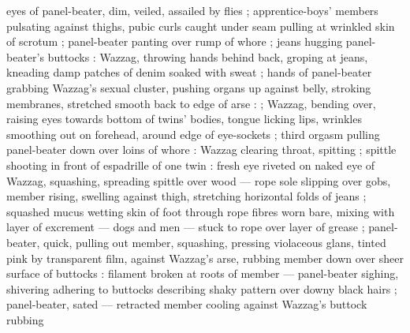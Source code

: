 eyes of panel-beater, dim, veiled, assailed by flies ; apprentice-boys' members pulsating against thighs, pubic curls caught under seam pulling at wrinkled skin of scrotum ; panel-beater panting over rump of whore ; jeans hugging panel-beater's buttocks : Wazzag, throwing hands behind back, groping at jeans, kneading damp patches of denim soaked with sweat ; hands of panel-beater grabbing Wazzag's sexual cluster, pushing organs up against belly, stroking membranes, stretched smooth back to edge of arse : {\td}  ; Wazzag, bending over, raising eyes towards bottom of twins' bodies, tongue licking lips, wrinkles smoothing out on forehead, around edge of eye-sockets ; third orgasm pulling panel-beater down over loins of whore : Wazzag clearing throat, spitting ; spittle shooting in front of espadrille of one twin : fresh eye riveted on naked eye of Wazzag, squashing, spreading spittle over wood --- rope sole slipping over gobs, member rising, swelling against thigh, stretching horizontal folds of jeans ; squashed mucus wetting skin of foot through rope fibres worn bare, mixing with layer of excrement --- dogs and men --- stuck to rope over layer of grease ; panel-beater, quick, pulling out member, squashing, pressing violaceous glans, tinted pink by transparent film, against Wazzag's arse, rubbing member down over sheer surface of buttocks : filament broken at roots of member --- panel-beater sighing, shivering {\dashcom} adhering to buttocks describing shaky pattern over downy black hairs ; panel-beater, sated --- retracted member cooling against Wazzag's buttock {\dashcom} rubbing %
